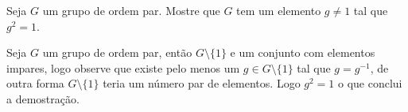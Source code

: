 \begin{homeworkProblem}
  Seja $G$ um grupo de ordem par. Mostre que $G$ tem um elemento $g \neq 1$ tal que $g^2 = 1$.
  \begin{solution}
    Seja $G$ um grupo de ordem par, então $G\setminus \{1\}$ e um conjunto com elementos impares, logo observe que existe pelo menos um $g\in G\setminus \{1\}$ tal que $g=g^{-1}$, de outra forma $G\setminus \{1\}$ teria um número par de elementos. Logo $g^{2}=1$ o que conclui a demostração. 
  \end{solution}
\end{homeworkProblem}

